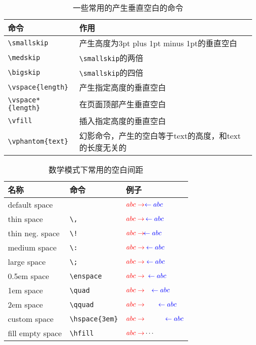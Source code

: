 
\begin{table}[!htbp]
    \centering
    \caption{一些常用的产生垂直空白的命令}
    \begin{tabular}{ll}
    \toprule
    命令 & 作用\\
    \midrule
    \verb|\smallskip| & 产生高度为3pt plus 1pt minus 1pt的垂直空白\\
    \verb|\medskip| & \verb|\smallskip|的两倍\\
    \verb|\bigskip| & \verb|\smallskip|的四倍\\
    \verb|\vspace{length}| & 产生指定高度的垂直空白\\
    \verb|\vspace*{length}| & 在页面顶部产生垂直空白\\
    \verb|\vfill| & 插入指定高度的垂直空白\\
    \verb|\vphantom{text}| & 幻影命令，产生的空白等于text的高度，和text的长度无关的\\
    \bottomrule
    \end{tabular}
\end{table}

\begin{table}[h]
    \newcommand\rlArrow[1]{\ensuremath{\color{red}{abc \rightarrow} #1 \color{blue}{\leftarrow abc}}}
    \centering
    \begin{tabular}{lll}
        \toprule[2pt]
        名称 & 命令 & 例子\\
        \midrule
        default space & & \rlArrow{}\\
        thin space & \verb|\,| & \rlArrow{\,}\\
        thin neg. space & \verb|\!| & \rlArrow{\!}\\
        medium space & \verb|\:| & \rlArrow{\:}\\
        large space & \verb|\;| & \rlArrow{\;}\\
        0.5em space & \verb|\enspace| & \rlArrow{\enspace}\\
        1em space & \verb|\quad| & \rlArrow{\quad}\\
        2em space & \verb|\qquad| & \rlArrow{\qquad}\\
        custom space & \verb|\hspace{3em}| & \rlArrow{\hspace{3em}}\\
        fill empty space & \verb|\hfill| & $\color{red}{abc \rightarrow} \color{black}\cdots$\\
        \bottomrule
    \end{tabular}
    \caption{数学模式下常用的空白间距\protect\footnotemark}
\end{table}

